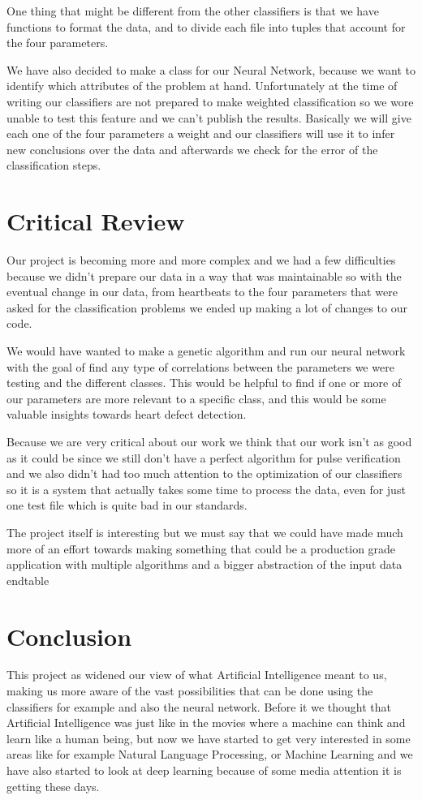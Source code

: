 \documentclass[conference]{IEEEtran}
\begin{document}
\begin{itemize}
\begin{itemize}
One thing that might be different from the other classifiers is that we have
functions to format the data, and to divide each file into tuples that account
for the four parameters.

We have also decided to make a class for our Neural Network, because we want to
identify which attributes of the problem at hand. Unfortunately at the time of
writing our classifiers are not prepared to make weighted classification so we
wore unable to test this feature and we can't publish the results.
Basically we will give each one of the four parameters a weight and our
classifiers will use it to infer new conclusions over the data and afterwards
we check for the error of the classification steps.

\section{Critical Review}
Our project is becoming more and more complex and we had a few difficulties
because we didn't prepare our data in a way that was maintainable so with the
eventual change in our data, from heartbeats to the four parameters that were
asked for the classification problems we ended up making a lot of changes to our
code.

We would have wanted to make a genetic algorithm and run our neural network with
the goal of find any type of correlations between the parameters we were testing
and the different classes. This would be helpful to find if one or more of our
parameters are more relevant to a specific class, and this would be some
valuable insights towards heart defect detection.

Because we are very critical about our work we think that our work isn't as
good as it could be since we still don't have a perfect algorithm for pulse
verification and we also didn't had too much attention to the optimization of
our classifiers so it is a system that actually takes some time to process the
data, even for just one test file which is quite bad in our standards.

The project itself is interesting but we must say that we could have made much
more of an effort towards making something that could be a production grade
application with multiple algorithms and a bigger abstraction of the input data
end{table}

\section{Conclusion}
This project as widened our view of what Artificial Intelligence meant to us,
making us more aware of the vast possibilities that can be done using the
classifiers for example and also the neural network. Before it we thought that
Artificial Intelligence was just like in the movies where a machine can think
and learn like a human being, but now we have started to get very interested in
some areas like for example Natural Language Processing, or Machine Learning and
we have also started to look at deep learning because of some media attention
it is getting these days.


\end{itemize}
\end{itemize}
\end{document}

